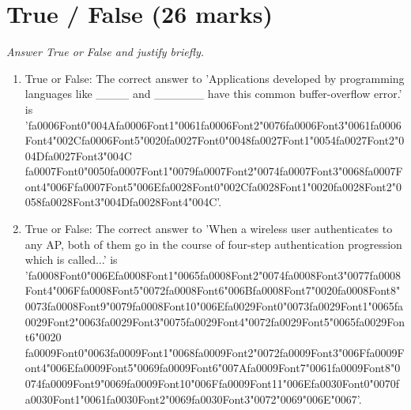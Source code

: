 \documentclass[12pt]{article}
\begin{document}
\section*{True / False (26 marks)}
\textit{Answer True or False and justify briefly.}
\begin{enumerate}[label=\arabic*.]
\item True or False: The correct answer to 'Applications developed by programming languages like \_\_\_\_ and \_\_\_\_\_\_ have this common buffer-overflow error.' is '{\csname fa0006Font0\endcsname\char"004A}{\csname fa0006Font1\endcsname\char"0061}{\csname fa0006Font2\endcsname\char"0076}{\csname fa0006Font3\endcsname\char"0061}{\csname fa0006Font4\endcsname\char"002C}{\csname fa0006Font5\endcsname\char"0020}{\csname fa0027Font0\endcsname\char"0048}{\csname fa0027Font1\endcsname\char"0054}{\csname fa0027Font2\endcsname\char"004D}{\csname fa0027Font3\endcsname\char"004C} {\csname fa0007Font0\endcsname\char"0050}{\csname fa0007Font1\endcsname\char"0079}{\csname fa0007Font2\endcsname\char"0074}{\csname fa0007Font3\endcsname\char"0068}{\csname fa0007Font4\endcsname\char"006F}{\csname fa0007Font5\endcsname\char"006E}{\csname fa0028Font0\endcsname\char"002C}{\csname fa0028Font1\endcsname\char"0020}{\csname fa0028Font2\endcsname\char"0058}{\csname fa0028Font3\endcsname\char"004D}{\csname fa0028Font4\endcsname\char"004C}'.
\item True or False: The correct answer to 'When a wireless user authenticates to any AP, both of them go in the course of four-step authentication progression which is called...' is '{\csname fa0008Font0\endcsname\char"006E}{\csname fa0008Font1\endcsname\char"0065}{\csname fa0008Font2\endcsname\char"0074}{\csname fa0008Font3\endcsname\char"0077}{\csname fa0008Font4\endcsname\char"006F}{\csname fa0008Font5\endcsname\char"0072}{\csname fa0008Font6\endcsname\char"006B}{\csname fa0008Font7\endcsname\char"0020}{\csname fa0008Font8\endcsname\char"0073}{\csname fa0008Font9\endcsname\char"0079}{\csname fa0008Font10\endcsname\char"006E}{\csname fa0029Font0\endcsname\char"0073}{\csname fa0029Font1\endcsname\char"0065}{\csname fa0029Font2\endcsname\char"0063}{\csname fa0029Font3\endcsname\char"0075}{\csname fa0029Font4\endcsname\char"0072}{\csname fa0029Font5\endcsname\char"0065}{\csname fa0029Font6\endcsname\char"0020} {\csname fa0009Font0\endcsname\char"0063}{\csname fa0009Font1\endcsname\char"0068}{\csname fa0009Font2\endcsname\char"0072}{\csname fa0009Font3\endcsname\char"006F}{\csname fa0009Font4\endcsname\char"006E}{\csname fa0009Font5\endcsname\char"0069}{\csname fa0009Font6\endcsname\char"007A}{\csname fa0009Font7\endcsname\char"0061}{\csname fa0009Font8\endcsname\char"0074}{\csname fa0009Font9\endcsname\char"0069}{\csname fa0009Font10\endcsname\char"006F}{\csname fa0009Font11\endcsname\char"006E}{\csname fa0030Font0\endcsname\char"0070}{\csname fa0030Font1\endcsname\char"0061}{\csname fa0030Font2\endcsname\char"0069}{\csname fa0030Font3\endcsname\char"0072}{\char"0069}{\char"006E}{\char"0067}'.

\end{enumerate}
\end{document}
